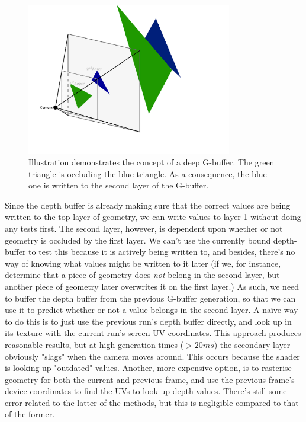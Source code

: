 \begin{figure}[!ht]
  \centering
    \includegraphics[width=0.8\textwidth]{img/2-layer}
    \caption{Illustration demonstrates the concept of a deep G-buffer. The green triangle is occluding the blue triangle. As a consequence, the blue one is written to the second layer of the G-buffer.}
    \label{fig-deep-buffer}
\end{figure}

Since the depth buffer is already making sure that the correct values are being written to the top layer of geometry, we can write values to layer 1 without doing any tests first. The second layer, however, is dependent upon whether or not geometry is occluded by the first layer. We can't use the currently bound depth-buffer to test this because it is actively being written to, and besides, there's no way of knowing what values might be written to it later (if we, for instance, determine that a piece of geometry does \emph{not} belong in the second layer, but another piece of geometry later overwrites it on the first layer.) As such, we need to buffer the depth buffer from the previous G-buffer generation, so that we can use it to predict whether or not a value belongs in the second layer. A naïve way to do this is to just use the previous run's depth buffer directly, and look up in its texture with the current run's screen UV-coordinates. This approach produces reasonable results, but at high generation times ($>20ms$) the secondary layer obviously "slags" when the camera moves around. This occurs because the shader is looking up "outdated" values. Another, more expensive option, is to rasterise geometry for both the current and previous frame, and use the previous frame's device coordinates to find the UVs to look up depth values. There's still some error related to the latter of the methods, but this is negligible compared to that of the former.

